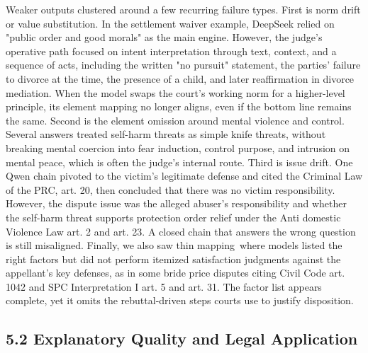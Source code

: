 Weaker outputs clustered around a few recurring failure types. First is norm drift or value substitution. In the settlement waiver example, DeepSeek relied on "public order and good morals" as the main engine. However, the judge's operative path focused on intent interpretation through text, context, and a sequence of acts, including the written "no pursuit" statement, the parties' failure to divorce at the time, the presence of a child, and later reaffirmation in divorce mediation. When the model swaps the court's working norm for a higher-level principle, its element mapping no longer aligns, even if the bottom line remains the same. Second is the element omission around mental violence and control. Several answers treated self-harm threats as simple knife threats, without breaking mental coercion into fear induction, control purpose, and intrusion on mental peace, which is often the judge's internal route. Third is issue drift. One Qwen chain pivoted to the victim's legitimate defense and cited the Criminal Law of the PRC, art. 20, then concluded that there was no victim responsibility. However, the dispute issue was the alleged abuser's responsibility and whether the self-harm threat supports protection order relief under the Anti domestic Violence Law art. 2 and art. 23. A closed chain that answers the wrong question is still misaligned. Finally, we also saw thin mapping~where models listed the right factors but did not perform itemized satisfaction judgments against the appellant's key defenses, as in some bride price disputes citing Civil Code art. 1042 and SPC Interpretation I art. 5 and art. 31. The factor list appears complete, yet it omits the rebuttal-driven steps courts use to justify disposition.

\hypertarget{explanatory-quality-and-legal-application}{%
\subsection{\texorpdfstring{\textbf{5.2 Explanatory Quality and Legal Application}}{5.2 Explanatory Quality and Legal Application}}\label{explanatory-quality-and-legal-application}}

